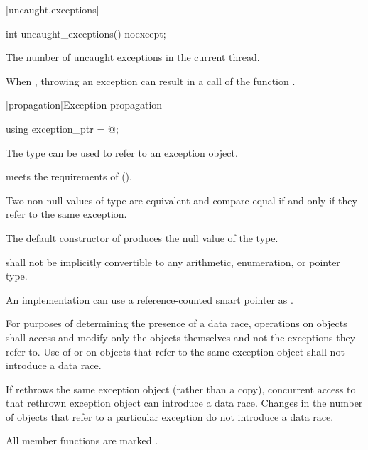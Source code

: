 [uncaught.exceptions]{}

%
\begin{itemdecl}
int uncaught_exceptions() noexcept;
\end{itemdecl}

\begin{itemdescr}
\pnum
\returns
The number of uncaught exceptions in the current thread.

\pnum
\remarks
When ,
throwing an exception can result in a call of the function
.
\end{itemdescr}

[propagation]{Exception propagation}

%
\begin{itemdecl}
using exception_ptr = @\unspec@;
\end{itemdecl}

\begin{itemdescr}
\pnum
The type  can be used to refer to an exception object.

\pnum
{} meets the requirements of
 ().

\pnum
Two non-null values of type  are equivalent and compare equal if and
only if they refer to the same exception.

\pnum
The default constructor of  produces the null value of the
type.

\pnum
{} shall not be implicitly convertible to any arithmetic,
enumeration, or pointer type.

\pnum
\begin{note}
An implementation can use a reference-counted smart
pointer as .
\end{note}

\pnum
For purposes of determining the presence of a data race, operations on
 objects shall access and modify only the
 objects themselves and not the exceptions they refer to.
Use of  or 
on  objects that refer to
the same exception object shall not introduce a data race.
\begin{note}
If
 rethrows the same exception object (rather than a copy),
concurrent access to that rethrown exception object can introduce a data race.
Changes in the number of  objects that refer to a
particular exception do not introduce a data race.
\end{note}

\pnum
All member functions are marked .
\end{itemdescr}

